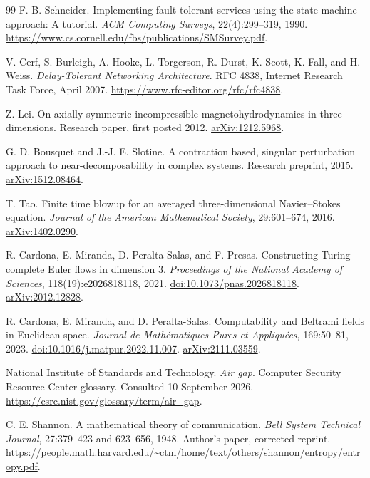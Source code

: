 \documentclass[11pt,a4paper]{article}
\theoremstyle{definition}
\theoremstyle{remark}
\begin{document}
\begin{thebibliography}{99}
F. B. Schneider. Implementing fault-tolerant services using the state machine approach: A tutorial. \emph{ACM Computing Surveys}, 22(4):299--319, 1990. \url{https://www.cs.cornell.edu/fbs/publications/SMSurvey.pdf}.

V. Cerf, S. Burleigh, A. Hooke, L. Torgerson, R. Durst, K. Scott, K. Fall, and H. Weiss. \emph{Delay-Tolerant Networking Architecture}. RFC 4838, Internet Research Task Force, April 2007. \url{https://www.rfc-editor.org/rfc/rfc4838}.

Z. Lei. On axially symmetric incompressible magnetohydrodynamics in three dimensions. Research paper, first posted 2012. \href{https://arxiv.org/abs/1212.5968}{arXiv:1212.5968}.

G. D. Bousquet and J.-J. E. Slotine. A contraction based, singular perturbation approach to near-decomposability in complex systems. Research preprint, 2015. \href{https://arxiv.org/abs/1512.08464}{arXiv:1512.08464}.

T. Tao. Finite time blowup for an averaged three-dimensional Navier--Stokes equation. \emph{Journal of the American Mathematical Society}, 29:601--674, 2016. \href{https://arxiv.org/abs/1402.0290}{arXiv:1402.0290}.

R. Cardona, E. Miranda, D. Peralta-Salas, and F. Presas. Constructing Turing complete Euler flows in dimension 3. \emph{Proceedings of the National Academy of Sciences}, 118(19):e2026818118, 2021. \href{https://doi.org/10.1073/pnas.2026818118}{doi:10.1073/pnas.2026818118}. \href{https://arxiv.org/abs/2012.12828}{arXiv:2012.12828}.

R. Cardona, E. Miranda, and D. Peralta-Salas. Computability and Beltrami fields in Euclidean space. \emph{Journal de Math\'ematiques Pures et Appliqu\'ees}, 169:50--81, 2023. \href{https://doi.org/10.1016/j.matpur.2022.11.007}{doi:10.1016/j.matpur.2022.11.007}. \href{https://arxiv.org/abs/2111.03559}{arXiv:2111.03559}.

National Institute of Standards and Technology. \emph{Air gap}. Computer Security Resource Center glossary. Consulted 10 September 2026. \url{https://csrc.nist.gov/glossary/term/air_gap}.

C. E. Shannon. A mathematical theory of communication. \emph{Bell System Technical Journal}, 27:379--423 and 623--656, 1948. Author's paper, corrected reprint. \url{https://people.math.harvard.edu/~ctm/home/text/others/shannon/entropy/entropy.pdf}.


\end{thebibliography}
\end{document}
